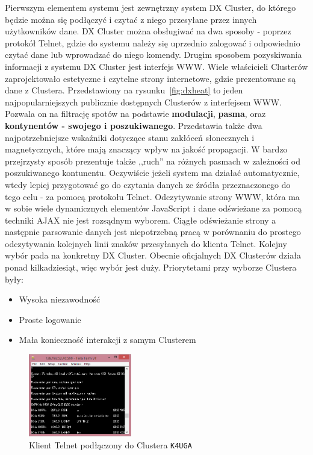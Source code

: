 \documentclass[]{mgr}
\begin{document}
        Pierwszym elementem systemu jest zewnętrzny system DX Cluster, do którego będzie można się podłączyć i czytać z niego przesyłane przez innych użytkowników dane. DX Cluster można obsługiwać na dwa sposoby - poprzez protokół Telnet, gdzie do systemu należy się uprzednio zalogować i odpowiednio czytać dane lub wprowadzać do niego komendy. Drugim sposobem pozyskiwania informacji z systemu DX Cluster jest interfejs WWW. Wiele właścicieli Clusterów zaprojektowało estetyczne i czytelne strony internetowe, gdzie prezentowane są dane z Clustera. Przedstawiony na rysunku~\ref{fig:dxheat} to jeden najpopularniejszych publicznie dostępnych Clusterów z interfejsem WWW. Pozwala on na filtrację spotów na podstawie \textbf{modulacji}, \textbf{pasma}, oraz \textbf{kontynentów - swojego i poszukiwanego}. Przedstawia także dwa najpotrzebniejsze wskaźniki dotyczące stanu zakłóceń słonecznych i magnetycznych, które mają znaczący wpływ na jakość propagacji. W bardzo przejrzysty sposób prezentuje także ,,ruch'' na różnych pasmach w zależności od poszukiwanego kontunentu. Oczywiście jeżeli system ma działać automatycznie, wtedy lepiej przygotować go do czytania danych ze źródła przeznaczonego do tego celu - za pomocą protokołu Telnet. Odczytywanie strony WWW, która ma w sobie wiele dynamicznych elementów JavaScript i dane odświeżane za pomocą techniki AJAX nie jest rozsądnym wyborem. Ciągłe odświeżanie strony a następnie parsowanie danych jest niepotrzebną pracą w porównaniu do prostego odczytywania kolejnych linii znaków przesyłanych do klienta Telnet. Kolejny wybór pada na konkretny DX Cluster. Obecnie oficjalnych DX Clusterów działa ponad kilkadziesiąt, więc wybór jest duży. Priorytetami przy wyborze Clustera były:

        \begin{itemize}
            \item Wysoka niezawodność
            \item Proste logowanie
            \item Mała konieczność interakcji z samym Clusterem
        \end{itemize}
        \begin{figure}
            \vspace{-25pt}
            \begin{center}
                \includegraphics[width=0.40\textwidth]{k4uga}
            \end{center}
            \vspace{-20pt}
            \caption{Klient Telnet podłączony do Clustera \texttt{K4UGA}}
            \vspace{-20pt}
            \label{fig:k4uga}
        \end{figure}
\end{document}
